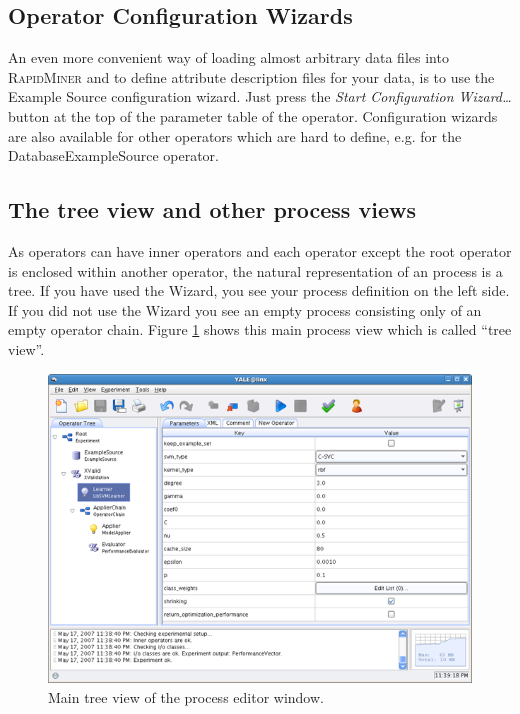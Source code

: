 \documentclass[11pt]{article}
\newcommand{\rapidminer}{\protect \textsc{RapidMiner}\xspace}
\begin{document}
\subsection{Operator Configuration Wizards}

An even more convenient way of loading almost arbitrary data files into \rapidminer 
and to define attribute description files for your data, is to use the Example 
Source configuration wizard. Just press the \emph{Start Configuration Wizard\ldots} 
button at the top of the parameter table of the operator. Configuration wizards are 
also available for other operators which are hard to define, e.g. for the DatabaseExampleSource
operator.




\subsection{The tree view and other process views}

As operators can have inner operators and each operator except the
root operator is enclosed within another operator, the natural
representation of an process is a tree. If you have used the
Wizard, you see your process definition on the left side. If you did not use the Wizard
you see an empty process consisting only of an empty operator
chain. Figure \ref{fig:main_experiment_view} shows this main
process view which is called ``tree view''.
\begin{figure}[ht]
\center
\includegraphics[width=0.88\linewidth]{main_experiment_view.png}
\caption{Main tree view of the process editor window.}
\label{fig:main_experiment_view}
\end{figure}
\end{document}
